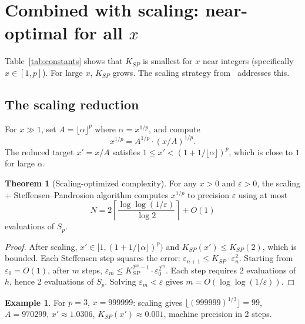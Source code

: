 \documentclass[11pt,a4paper]{article}
\theoremstyle{definition}
\newtheorem{theorem}{Theorem}[section]
\newtheorem{example}{Example}[section]
\newcommand{\eps}{\varepsilon}
\begin{document}
\section{Combined with scaling: near-optimal for all \texorpdfstring{$x$}{x}}
\label{sec:scaling}

Table~\ref{tab:constants} shows that $K_{SP}$ is smallest for $x$ near integers (specifically $x \in [1, p]$).  For large $x$, $K_{SP}$ grows.  The scaling strategy from~\cite{besevic2026} addresses this.

\subsection{The scaling reduction}

For $x \gg 1$, set $A = \lfloor \alpha \rfloor^p$ where $\alpha = x^{1/p}$, and compute
\[
  x^{1/p} = A^{1/p} \cdot (x/A)^{1/p}.
\]
The reduced target $x' = x/A$ satisfies $1 \leq x' < (1 + 1/\lfloor\alpha\rfloor)^p$, which is close to $1$ for large $\alpha$.

\begin{theorem}[Scaling-optimized complexity]
\label{thm:complexity}
For any $x > 0$ and $\eps > 0$, the scaling + Steffensen--Pandrosion algorithm computes $x^{1/p}$ to precision $\eps$ using at most
\begin{equation}
  \label{eq:complexity}
  N = 2\left\lceil \frac{\log\log(1/\eps)}{\log 2} \right\rceil + O(1)
\end{equation}
evaluations of $S_p$.
\end{theorem}

\begin{proof}
After scaling, $x' \in [1, (1+1/\lfloor\alpha\rfloor)^p)$ and $K_{SP}(x') \leq K_{SP}(2)$, which is bounded.  Each Steffensen step squares the error: $\eps_{n+1} \leq K_{SP} \cdot \eps_n^2$.  Starting from $\eps_0 = O(1)$, after $m$ steps, $\eps_m \leq K_{SP}^{2^m - 1} \cdot \eps_0^{2^m}$.  Each step requires 2 evaluations of $h$, hence 2 evaluations of $S_p$.  Solving $\eps_m < \eps$ gives $m = O(\log\log(1/\eps))$.
\end{proof}

\begin{example}
For $p = 3$, $x = 999999$: scaling gives $\lfloor (999999)^{1/3} \rfloor = 99$, $A = 970299$, $x' \approx 1.0306$, $K_{SP}(x') \approx 0.001$, machine precision in 2 steps.
\end{example}
\end{document}
